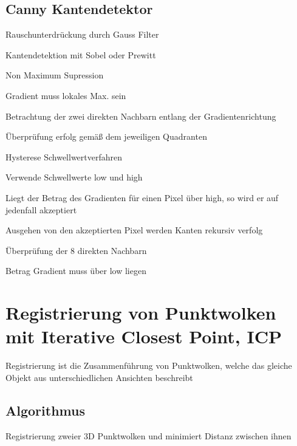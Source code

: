 \subsection{Canny Kantendetektor}
\begin{compactenum}
    \item Rauschunterdrückung durch Gauss Filter
    \item Kantendetektion mit Sobel oder Prewitt
    \item Non Maximum Supression
    \begin{compactitem}
        \item Gradient muss lokales Max. sein
        \item Betrachtung der zwei direkten Nachbarn entlang der Gradientenrichtung
        \item Überprüfung erfolg gemäß dem jeweiligen Quadranten
    \end{compactitem}
    \item Hysterese Schwellwertverfahren
    \begin{compactitem}
        \item Verwende Schwellwerte low und high
        \item Liegt der Betrag des Gradienten für einen Pixel über high, so wird er
        auf jedenfall akzeptiert
        \item Ausgehen von den akzeptierten Pixel werden Kanten rekursiv verfolg
        \begin{compactitem}
            \item Überprüfung der 8 direkten Nachbarn
            \item Betrag Gradient muss über low liegen
        \end{compactitem}
    \end{compactitem}
\end{compactenum}

\section{Registrierung von Punktwolken mit Iterative Closest Point, ICP}
Registrierung ist die Zusammenführung von Punktwolken, welche das gleiche
Objekt aus unterschiedlichen Ansichten beschreibt

\subsection{Algorithmus}
Registrierung zweier 3D Punktwolken und minimiert Distanz zwischen ihnen

